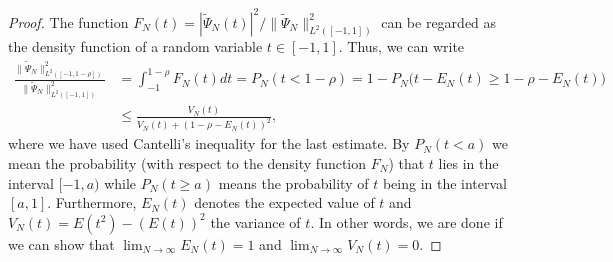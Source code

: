 \documentclass[a4paper, 10pt]{article}
\numberwithin{equation}{section}
\theoremstyle{definition}
\begin{document}
\begin{proof}
The function $F_N(t)={|\tilde{\Psi}_N(t)|^2}/{\|\tilde{\Psi}_N\|^2_{L^2([-1,1])}}$ can be regarded as the density function of a random variable $t\in[-1,1]$. Thus, we can write
\begin{align}
\frac{\big\|\tilde{\Psi}_N\big\|^2_{L^2([-1,1-\rho])}}{\big\|\tilde{\Psi}_N\big\|^2_{L^2([-1,1])}}&=\int_{-1}^{1-\rho}F_N(t)dt=P_N(t< 1-\rho)=1-P_N\big(t-E_N(t)\geq 1-\rho-E_N(t)\big)\nonumber
\\&\leq \frac{V_N(t)}{V_N(t)+ (1-\rho-E_N(t))^2},
\end{align}
where we have used Cantelli's inequality for the last estimate. By $P_N(t< a)$ we mean the probability (with respect to the density function $F_N$) that $t$ lies in the interval $[-1,a)$ while $P_N(t\geq a)$ means the probability of $t$ being in the interval $[a,1]$. Furthermore, $E_N(t)$ denotes the expected value of $t$ and $V_N(t)=E(t^2)-(E(t))^2$ the variance of $t$. In other words, we are done if we can show that $\lim_{N\to\infty}E_N(t)=1$ and $\lim_{N\to \infty}V_N(t)=0$. 


\end{proof}
\end{document}

